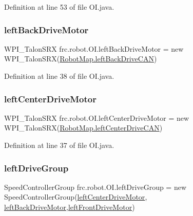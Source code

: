 Definition at line 53 of file O\+I.\+java.

\mbox{\label{classfrc_1_1robot_1_1OI_a88080d092baf8ece2c22f2ceec4f6f8f}} 
\subsubsection{\texorpdfstring{left\+Back\+Drive\+Motor}{leftBackDriveMotor}}
{\footnotesize\ttfamily W\+P\+I\+\_\+\+Talon\+S\+RX frc.\+robot.\+O\+I.\+left\+Back\+Drive\+Motor = new W\+P\+I\+\_\+\+Talon\+S\+RX(\hyperlink{classfrc_1_1robot_1_1RobotMap_a0f78f6850b0e060cc6acd88cc80ffa04}{Robot\+Map.\+left\+Back\+Drive\+C\+AN})\hspace{0.3cm}{\ttfamily [static]}}



Definition at line 38 of file O\+I.\+java.

\mbox{\label{classfrc_1_1robot_1_1OI_a8c33a9f0b9e366e48abd23ab01907e18}} 
\subsubsection{\texorpdfstring{left\+Center\+Drive\+Motor}{leftCenterDriveMotor}}
{\footnotesize\ttfamily W\+P\+I\+\_\+\+Talon\+S\+RX frc.\+robot.\+O\+I.\+left\+Center\+Drive\+Motor = new W\+P\+I\+\_\+\+Talon\+S\+RX(\hyperlink{classfrc_1_1robot_1_1RobotMap_a9d04abf669a5ad42cb023e3ff3b56bcd}{Robot\+Map.\+left\+Center\+Drive\+C\+AN})\hspace{0.3cm}{\ttfamily [static]}}



Definition at line 37 of file O\+I.\+java.

\mbox{\label{classfrc_1_1robot_1_1OI_a6d76241e542ab271366e4cb4bf7b5133}} 
\subsubsection{\texorpdfstring{left\+Drive\+Group}{leftDriveGroup}}
{\footnotesize\ttfamily Speed\+Controller\+Group frc.\+robot.\+O\+I.\+left\+Drive\+Group = new Speed\+Controller\+Group(\hyperlink{classfrc_1_1robot_1_1OI_a8c33a9f0b9e366e48abd23ab01907e18}{left\+Center\+Drive\+Motor}, \hyperlink{classfrc_1_1robot_1_1OI_a88080d092baf8ece2c22f2ceec4f6f8f}{left\+Back\+Drive\+Motor},\hyperlink{classfrc_1_1robot_1_1OI_a3f39e281419ebd60b94126e87e3ec81d}{left\+Front\+Drive\+Motor})\hspace{0.3cm}{\ttfamily [static]}}



